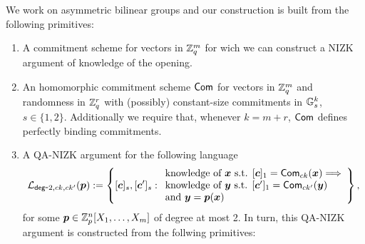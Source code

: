 We work on asymmetric bilinear groups and our construction is built from the following primitives:
\begin{enumerate}
\item A commitment scheme for vectors in $\mathbb{Z}_q^m$ for wich we can construct a NIZK argument of knowledge of the opening.
\item An homomorphic commitment scheme $\mathsf{Com}$ for vectors in $\mathbb{Z}_q^m$ and randomness in $\mathbb{Z}_q^r$ with (possibly) constant-size commitments in $\mathbb{G}_s^k$, $s\in\{1,2\}$. Additionally we require that, whenever $k=m+r$, $\mathsf{Com}$ defines perfectly binding commitments.
\item A QA-NIZK argument for the following language
$$
\mathcal{L}_{\mathsf{deg}\mbox{-}2,ck,ck'}({\boldsymbol{p}}):=\left\{[{\boldsymbol{c}}]_s,[{\boldsymbol{c}}']_s:
\begin{array}{l}
		\text{knowledge of } {\boldsymbol{x}} \text{ s.t. }
		{[{\boldsymbol{c}}]_1=\mathsf{Com}_{ck}({\boldsymbol{x}})}
		\Longrightarrow\\
		\text{knowledge of }{\boldsymbol{y}}\text{ s.t. }{[{\boldsymbol{c}}']_1=\mathsf{Com}_{ck'}({\boldsymbol{y}})}\\
		\text{and } {\boldsymbol{y}}={\boldsymbol{p}}({\boldsymbol{x}})
	\end{array}\right\},
$$
for some ${\boldsymbol{p}}\in\mathbb{Z}_p^n[X_1,\ldots,X_m]$ of degree at most 2. In turn, this QA-NIZK argument is constructed from the follwing primitives:


\end{enumerate}
